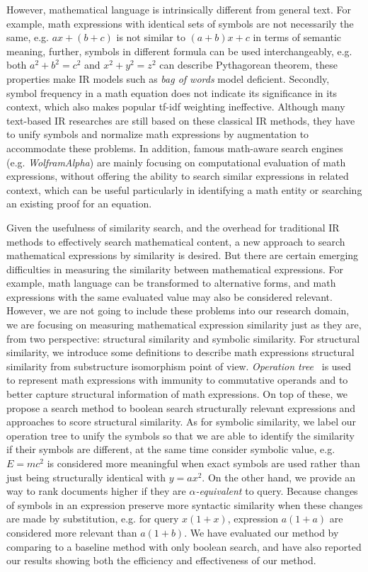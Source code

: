 \documentclass{acm_proc_article-sp}
\begin{document}
However, mathematical language is intrinsically different from general text.
For example, math expressions with identical sets of symbols are not necessarily the same, e.g. $ax+(b+c)$ is not similar to $(a+b)x+c$ in terms of semantic meaning,
further, symbols in different formula can be used interchangeably, e.g. both $a^2+b^2=c^2$ and $x^2+y^2=z^2$ can describe Pythagorean theorem,
these properties make IR models such as \textit{bag of words} model deficient. 
Secondly, symbol frequency in a math equation does not indicate its significance in its context, which also makes popular tf-idf weighting ineffective. 
Although many text-based IR researches are still based on these classical IR methods, they have to unify symbols and normalize math expressions by augmentation to accommodate these problems.
In addition, famous math-aware search engines (e.g. \textit{WolframAlpha}) are mainly focusing on computational evaluation of math expressions, without offering the ability to search similar expressions in related context, 
which can be useful particularly in identifying a math entity or searching an existing proof for an equation.

Given the usefulness of similarity search, and the overhead for traditional IR methods to effectively search mathematical content, 
a new approach to search mathematical expressions by similarity is desired.
But there are certain emerging difficulties in measuring the similarity between mathematical expressions.
For example, math language can be transformed to alternative forms, 
and math expressions with the same evaluated value may also be considered relevant. 
However, we are not going to include these problems into our research domain, we are focusing on measuring mathematical expression similarity just as they are, from two perspective: structural similarity and symbolic similarity.
For structural similarity, we introduce some definitions to describe math expressions structural similarity from substructure isomorphism point of view. 
\textit{Operation tree}~\cite{goodsurvey} is used to represent math expressions with immunity to commutative operands and to better capture structural information of math expressions. 
On top of these, we propose a search method to boolean search structurally relevant expressions and approaches to score structural similarity.
As for symbolic similarity, we label our operation tree to unify the symbols so that we are able to identify the similarity if their symbols are different,
at the same time consider symbolic value, e.g. $E=mc^2$ is considered more meaningful when exact symbols are used rather than just being structurally identical with $y=ax^2$.
On the other hand, we provide an way to rank documents higher if they are \textit{$\alpha$-equivalent} to query.
Because changes of symbols in an expression preserve more syntactic similarity when these changes are made by substitution, e.g. for query $x(1+x)$, expression $a(1+a)$ are considered more relevant than $a(1+b)$. 
We have evaluated our method by comparing to a baseline method with only boolean search, and have also reported our results showing both the efficiency and effectiveness of our method.
\end{document}
